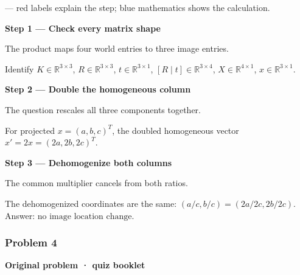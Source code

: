 \documentclass[letterpaper,11pt,english,openany,oneside]{jupyterBook}
\begin{document}
\sphinxAtStartPar
{} — red labels explain the step; blue mathematics shows the calculation.

\par\medskip{}
{\color{QuizStepRed}\bfseries Step 1 — Check every matrix shape}\par\smallskip

\sphinxAtStartPar
{} The product maps four world entries to three image entries.

\sphinxAtStartPar
Identify {\color{QuizMathBlue} \(K\in\mathbb R^{3\times3}\)}, {\color{QuizMathBlue} \(R\in\mathbb R^{3\times3}\)}, {\color{QuizMathBlue} \(t\in\mathbb R^{3\times1}\)}, {\color{QuizMathBlue} \([R\mid t]\in\mathbb R^{3\times4}\)}, {\color{QuizMathBlue} \(X\in\mathbb R^{4\times1}\)}, {\color{QuizMathBlue} \(x\in\mathbb R^{3\times1}\)}.

\par

\par\medskip{}
{\color{QuizStepRed}\bfseries Step 2 — Double the homogeneous column}\par\smallskip

\sphinxAtStartPar
{} The question rescales all three components together.

\sphinxAtStartPar
For projected {\color{QuizMathBlue} \(x=(a,b,c)^T\)}, the doubled homogeneous vector {\color{QuizMathBlue} \(x'=2x=(2a,2b,2c)^T\)}.

\par

\par\medskip{}
{\color{QuizStepRed}\bfseries Step 3 — Dehomogenize both columns}\par\smallskip

\sphinxAtStartPar
{} The common multiplier cancels from both ratios.

\sphinxAtStartPar
The dehomogenized coordinates are the same: {\color{QuizMathBlue} \((a/c,b/c)=(2a/2c,2b/2c)\)}. Answer: {\color{QuizMathBlue} \(\boxed{\text{no image location change}}\)}.

\par


\subsubsection{Problem 4}
\label{\detokenize{lectures/lecture03/quiz-workbook:quiz-11-q4}}\label{\detokenize{lectures/lecture03/quiz-workbook:id4}}
\par\medskip\textbf{Original problem · quiz booklet}\par\smallskip
\end{document}
